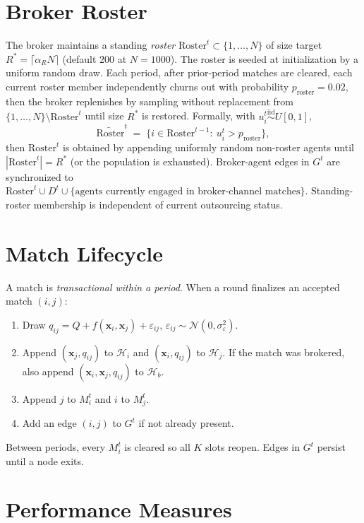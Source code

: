 \documentclass[11pt]{article}
\newcommand{\x}{\mathbf{x}}
\newcommand{\Roster}{\mathrm{Roster}}
\newcommand{\Hist}{\mathcal{H}}
\newcommand{\Ntot}{N}
\begin{document}
\section{Broker Roster}\label{sec:roster}

The broker maintains a standing \emph{roster} $\Roster^t\subset\{1,\ldots,\Ntot\}$ of size target $R^* = \lceil\alpha_R\Ntot\rceil$ (default $200$ at $\Ntot=1000$). The roster is seeded at initialization by a uniform random draw. Each period, after prior-period matches are cleared, each current roster member independently churns out with probability $p_{\text{roster}}=0.02$, then the broker replenishes by sampling without replacement from $\{1,\ldots,\Ntot\}\setminus\Roster^t$ until size $R^*$ is restored. Formally, with $u_i^t \overset{\text{iid}}{\sim} U[0,1]$,
\begin{equation}
\widetilde{\Roster}^t \;=\; \{i\in \Roster^{t-1}:\ u_i^t > p_{\text{roster}}\},
\label{eq:roster-churn}
\end{equation}
then $\Roster^t$ is obtained by appending uniformly random non-roster agents until $|\Roster^t|=R^*$ (or the population is exhausted). Broker-agent edges in $G^t$ are synchronized to $\Roster^t\cup D^t\cup\{\text{agents currently engaged in broker-channel matches}\}$. Standing-roster membership is independent of current outsourcing status.

\section{Match Lifecycle}\label{sec:lifecycle}

A match is \emph{transactional within a period}. When a round finalizes an accepted match $(i,j)$:
\begin{enumerate}[leftmargin=*,itemsep=2pt]
\item Draw $q_{ij} = Q + f(\x_i,\x_j) + \varepsilon_{ij}$, $\varepsilon_{ij}\sim\mathcal{N}(0,\sigma_\varepsilon^2)$.
\item Append $(\x_j,q_{ij})$ to $\Hist_i$ and $(\x_i,q_{ij})$ to $\Hist_j$. If the match was brokered, also append $(\x_i,\x_j,q_{ij})$ to $\Hist_b$.
\item Append $j$ to $M_i^t$ and $i$ to $M_j^t$.
\item Add an edge $(i,j)$ to $G^t$ if not already present.
\end{enumerate}
Between periods, every $M_i^{t}$ is cleared so all $K$ slots reopen. Edges in $G^t$ persist until a node exits.

\section{Performance Measures}\label{sec:measures}
\end{document}
